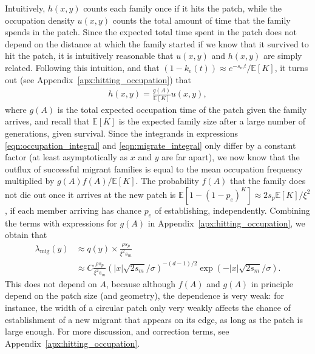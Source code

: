 \documentclass{article}
\newcommand{\E}{\mathbb{E}}
\newcommand{\migrate}{\lambda_\text{mig}}
\begin{document}
Intuitively, $h(x,y)$ counts each family once if it hits the patch,
while the occupation density $u(x,y)$ counts the total amount of time that the family spends in the patch.
Since the expected total time spent in the patch does not depend on the distance at which the family started
if we know that it survived to hit the patch,
it is intuitively reasonable that $u(x,y)$ and $h(x,y)$ are simply related.
Following this intuition,
and that $(1-k_e(t)) \approx e^{-s_m t}/\E[K]$,
it turns out (see Appendix~\ref{apx:hitting_occupation}) that
\begin{align} 
  h(x,y) = \frac{ g(A) }{ \E[K] } u(x,y),
\end{align}
where $g(A)$ is the total expected occupation time of the patch given the family arrives,
and recall that $\E[K]$ is the expected family size after a large number of generations, given survival.
Since the integrands in expressions \ref{eqn:occupation_integral} and \ref{eqn:migrate_integral} only differ by a constant factor
(at least asymptotically as $x$ and $y$ are far apart),
we now know that the outflux of successful migrant families is equal to the mean occupation frequency
multiplied by $g(A) f(A) / \E[K]$.
The probability $f(A)$ that the family does not die out once it arrives at the new patch is
$\E[1-(1-p_e)^K] \approx 2 s_p \E[K] / \xi^2$,
if each member arriving has chance $p_e$ of establishing, independently.
Combining the terms with expressions for $g(A)$ in Appendix~\ref{apx:hitting_occupation},
we obtain that
\begin{align}
  \label{eqn:migrate} 
  \migrate(y) &\approx q(y) \times \frac{ \rho s_p  }{ \xi^2 s_m }  \\
  &\approx C \frac{ \rho s_p  }{ \xi^2 s_m } \left( |x| \sqrt{2 s_m}/\sigma \right)^{-(d-1)/2} \exp( - |x| \sqrt{2 s_m} / \sigma) .
\end{align}
This does not depend on $A$, because although
$f(A)$ and $g(A)$ in principle depend on the patch size (and geometry),
the dependence is very weak:
for instance, the width of a circular patch only very weakly affects the chance 
of establishment of a new migrant that appears on its edge,
as long as the patch is large enough.
For more discussion, and correction terms, see Appendix~\ref{apx:hitting_occupation}.
\end{document}
